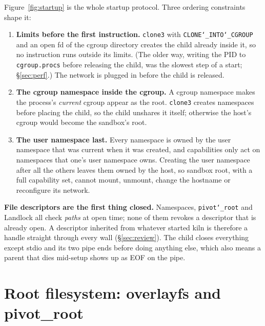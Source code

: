 \documentclass[10pt,letterpaper]{article}
\newcommand{\code}[1]{\texttt{#1}}
\newcommand{\us}{\char`\_}
\begin{document}
Figure~\ref{fig:startup} is the whole startup protocol. Three ordering
constraints shape it:

\begin{enumerate}
\item \textbf{Limits before the first instruction.} \code{clone3} with
\code{CLONE\us{}INTO\us{}CGROUP} and an open fd of the cgroup directory creates the
child already inside it, so no instruction runs outside its limits. (The older
way, writing the PID to \code{cgroup.procs} before releasing the child, was the
slowest step of a start; \S\ref{sec:perf}.) The network is plugged in before the
child is released.
\item \textbf{The cgroup namespace inside the cgroup.} A cgroup namespace makes
the process's \emph{current} cgroup appear as the root. \code{clone3} creates
namespaces before placing the child, so the child unshares it itself; otherwise
the host's cgroup would become the sandbox's root.
\item \textbf{The user namespace last.} Every namespace is owned by the user
namespace that was current when it was created, and capabilities only act on
namespaces that one's user namespace owns. Creating the user namespace after all
the others leaves them owned by the host, so sandbox root, with a full capability
set, cannot mount, unmount, change the hostname or reconfigure its network.
\end{enumerate}

\textbf{File descriptors are the first thing closed.} Namespaces,
\code{pivot\us{}root} and Landlock all check \emph{paths} at open time; none of
them revokes a descriptor that is already open. A descriptor inherited from
whatever started kiln is therefore a handle straight through every wall
(\S\ref{sec:review}). The child closes everything except stdio and its two pipe
ends before doing anything else, which also means a parent that dies mid-setup
shows up as EOF on the pipe.

\section{Root filesystem: overlayfs and pivot\_root}
\end{document}
